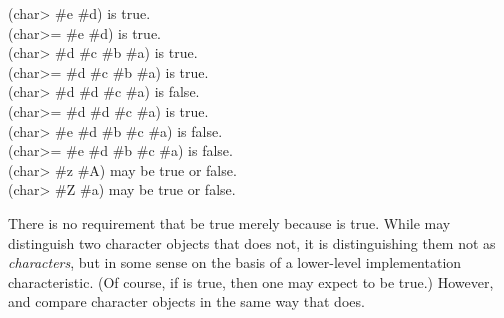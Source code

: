 \begin{defun}[Function]
\begin{lisp}
(char> \#{\Xbackslash}e \#{\Xbackslash}d) {\rm is true.} \\
(char>= \#{\Xbackslash}e \#{\Xbackslash}d) {\rm is true.} \\
(char> \#{\Xbackslash}d \#{\Xbackslash}c \#{\Xbackslash}b \#{\Xbackslash}a) {\rm is true.} \\
(char>= \#{\Xbackslash}d \#{\Xbackslash}c \#{\Xbackslash}b \#{\Xbackslash}a) {\rm is true.} \\
(char> \#{\Xbackslash}d \#{\Xbackslash}d \#{\Xbackslash}c \#{\Xbackslash}a) {\rm is false.} \\
(char>= \#{\Xbackslash}d \#{\Xbackslash}d \#{\Xbackslash}c \#{\Xbackslash}a) {\rm is true.} \\
(char> \#{\Xbackslash}e \#{\Xbackslash}d \#{\Xbackslash}b \#{\Xbackslash}c \#{\Xbackslash}a) {\rm is false.} \\
(char>= \#{\Xbackslash}e \#{\Xbackslash}d \#{\Xbackslash}b \#{\Xbackslash}c \#{\Xbackslash}a) {\rm is false.} \\
(char> \#{\Xbackslash}z \#{\Xbackslash}A) {\rm may be true or false.} \\
(char> \#{\Xbackslash}Z \#{\Xbackslash}a) {\rm may be true or false.}
\end{lisp}

There is no requirement that  be true merely because
 is true.  While  may distinguish two character
objects that  does not, it is distinguishing them not
as {\it characters}, but in some sense on the basis of a lower-level
implementation characteristic.
(Of course, if  is true,
then one may expect  to be true.)
However,  and 
compare character objects in the same
way that  does.
\end{defun}

